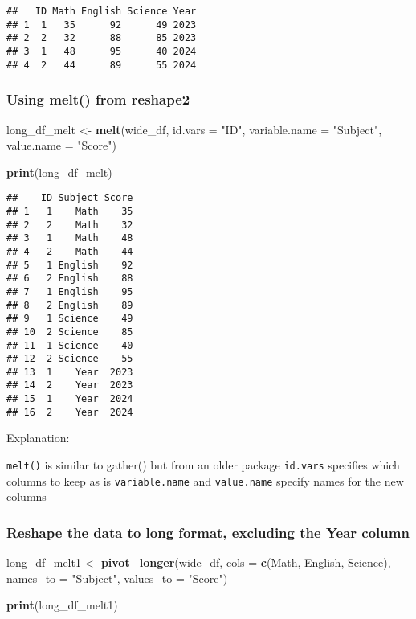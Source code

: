 \documentclass[
]{article}
\newenvironment{Shaded}{\begin{snugshade}}{\end{snugshade}}
\newcommand{\AttributeTok}[1]{\textcolor[rgb]{0.13,0.29,0.53}{#1}}
\newcommand{\FunctionTok}[1]{\textcolor[rgb]{0.13,0.29,0.53}{\textbf{#1}}}
\newcommand{\NormalTok}[1]{#1}
\newcommand{\OtherTok}[1]{\textcolor[rgb]{0.56,0.35,0.01}{#1}}
\newcommand{\StringTok}[1]{\textcolor[rgb]{0.31,0.60,0.02}{#1}}
\begin{document}
\begin{verbatim}
##   ID Math English Science Year
## 1  1   35      92      49 2023
## 2  2   32      88      85 2023
## 3  1   48      95      40 2024
## 4  2   44      89      55 2024
\end{verbatim}

\hypertarget{using-melt-from-reshape2}{%
\subsubsection{Using melt() from
reshape2}\label{using-melt-from-reshape2}}

\begin{Shaded}
\begin{Highlighting}[]
\NormalTok{long\_df\_melt }\OtherTok{\textless{}{-}} \FunctionTok{melt}\NormalTok{(wide\_df, }\AttributeTok{id.vars =} \StringTok{"ID"}\NormalTok{, }
                     \AttributeTok{variable.name =} \StringTok{"Subject"}\NormalTok{, }\AttributeTok{value.name =} \StringTok{"Score"}\NormalTok{)}

\FunctionTok{print}\NormalTok{(long\_df\_melt)}
\end{Highlighting}
\end{Shaded}

\begin{verbatim}
##    ID Subject Score
## 1   1    Math    35
## 2   2    Math    32
## 3   1    Math    48
## 4   2    Math    44
## 5   1 English    92
## 6   2 English    88
## 7   1 English    95
## 8   2 English    89
## 9   1 Science    49
## 10  2 Science    85
## 11  1 Science    40
## 12  2 Science    55
## 13  1    Year  2023
## 14  2    Year  2023
## 15  1    Year  2024
## 16  2    Year  2024
\end{verbatim}

Explanation:

\texttt{melt()} is similar to gather() but from an older package
\texttt{id.vars} specifies which columns to keep as is
\texttt{variable.name} and \texttt{value.name} specify names for the new
columns

\hypertarget{reshape-the-data-to-long-format-excluding-the-year-column}{%
\subsubsection{Reshape the data to long format, excluding the Year
column}\label{reshape-the-data-to-long-format-excluding-the-year-column}}

\begin{Shaded}
\begin{Highlighting}[]
\NormalTok{long\_df\_melt1 }\OtherTok{\textless{}{-}} \FunctionTok{pivot\_longer}\NormalTok{(wide\_df, }
                        \AttributeTok{cols =} \FunctionTok{c}\NormalTok{(Math, English, Science), }
                        \AttributeTok{names\_to =} \StringTok{"Subject"}\NormalTok{, }
                        \AttributeTok{values\_to =} \StringTok{"Score"}\NormalTok{)}

\FunctionTok{print}\NormalTok{(long\_df\_melt1)}
\end{Highlighting}
\end{Shaded}
\end{document}
